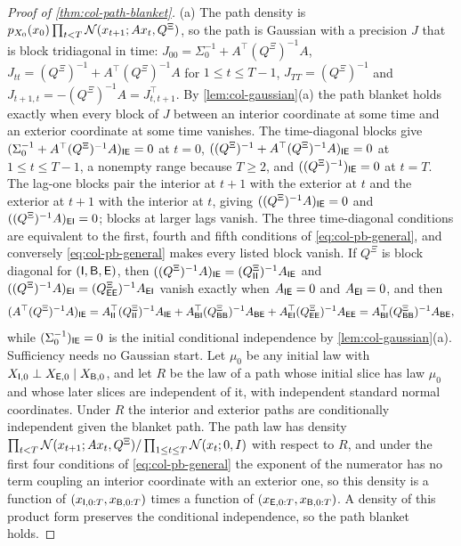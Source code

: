 \begin{proof}[Proof of \cref{thm:col-path-blanket}]
(a) The path density is $p_{X_0}(x_0)\prod_{t<T}\mathcal{N}(x_{t+1};Ax_t,Q^{\Xi})$, so the path is Gaussian with a precision $J$ that is block tridiagonal in time: $J_{00}=\Sigma_0^{-1}+A^\top(Q^{\Xi})^{-1}A$, $J_{tt}=(Q^{\Xi})^{-1}+A^\top(Q^{\Xi})^{-1}A$ for $1\le t\le T-1$, $J_{TT}=(Q^{\Xi})^{-1}$ and $J_{t+1,t}=-(Q^{\Xi})^{-1}A=J_{t,t+1}^\top$. By \cref{lem:col-gaussian}(a) the path blanket holds exactly when every block of $J$ between an interior coordinate at some time and an exterior coordinate at some time vanishes. The time-diagonal blocks give $(\Sigma_0^{-1}+A^\top(Q^{\Xi})^{-1}A)_{\mathsf{I}\mathsf{E}}=0$ at $t=0$, $((Q^{\Xi})^{-1}+A^\top(Q^{\Xi})^{-1}A)_{\mathsf{I}\mathsf{E}}=0$ at $1\le t\le T-1$, a nonempty range because $T\ge2$, and $((Q^{\Xi})^{-1})_{\mathsf{I}\mathsf{E}}=0$ at $t=T$. The lag-one blocks pair the interior at $t+1$ with the exterior at $t$ and the exterior at $t+1$ with the interior at $t$, giving $((Q^{\Xi})^{-1}A)_{\mathsf{I}\mathsf{E}}=0$ and $((Q^{\Xi})^{-1}A)_{\mathsf{E}\mathsf{I}}=0$; blocks at larger lags vanish. The three time-diagonal conditions are equivalent to the first, fourth and fifth conditions of \eqref{eq:col-pb-general}, and conversely \eqref{eq:col-pb-general} makes every listed block vanish. If $Q^{\Xi}$ is block diagonal for $(\mathsf{I},\mathsf{B},\mathsf{E})$, then $((Q^{\Xi})^{-1}A)_{\mathsf{I}\mathsf{E}}=(Q^{\Xi}_{\mathsf{I}\mathsf{I}})^{-1}A_{\mathsf{I}\mathsf{E}}$ and $((Q^{\Xi})^{-1}A)_{\mathsf{E}\mathsf{I}}=(Q^{\Xi}_{\mathsf{E}\mathsf{E}})^{-1}A_{\mathsf{E}\mathsf{I}}$ vanish exactly when $A_{\mathsf{I}\mathsf{E}}=0$ and $A_{\mathsf{E}\mathsf{I}}=0$, and then
\[
(A^\top(Q^{\Xi})^{-1}A)_{\mathsf{I}\mathsf{E}}=A_{\mathsf{I}\mathsf{I}}^\top(Q^{\Xi}_{\mathsf{I}\mathsf{I}})^{-1}A_{\mathsf{I}\mathsf{E}}+A_{\mathsf{B}\mathsf{I}}^\top(Q^{\Xi}_{\mathsf{B}\mathsf{B}})^{-1}A_{\mathsf{B}\mathsf{E}}+A_{\mathsf{E}\mathsf{I}}^\top(Q^{\Xi}_{\mathsf{E}\mathsf{E}})^{-1}A_{\mathsf{E}\mathsf{E}}=A_{\mathsf{B}\mathsf{I}}^\top(Q^{\Xi}_{\mathsf{B}\mathsf{B}})^{-1}A_{\mathsf{B}\mathsf{E}},
\]
while $(\Sigma_0^{-1})_{\mathsf{I}\mathsf{E}}=0$ is the initial conditional independence by \cref{lem:col-gaussian}(a). Sufficiency needs no Gaussian start. Let $\mu_0$ be any initial law with $X_{\mathsf{I},0}\perp X_{\mathsf{E},0}\mid X_{\mathsf{B},0}$, and let $R$ be the law of a path whose initial slice has law $\mu_0$ and whose later slices are independent of it, with independent standard normal coordinates. Under $R$ the interior and exterior paths are conditionally independent given the blanket path. The path law has density $\prod_{t<T}\mathcal{N}(x_{t+1};Ax_t,Q^{\Xi})/\prod_{1\le t\le T}\mathcal{N}(x_t;0,I)$ with respect to $R$, and under the first four conditions of \eqref{eq:col-pb-general} the exponent of the numerator has no term coupling an interior coordinate with an exterior one, so this density is a function of $(x_{\mathsf{I},0:T},x_{\mathsf{B},0:T})$ times a function of $(x_{\mathsf{E},0:T},x_{\mathsf{B},0:T})$. A density of this product form preserves the conditional independence, so the path blanket holds.


\end{proof}
